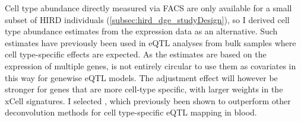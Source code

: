 Cell type abundance directly measured via \gls{FACS} are only available for a small subset of \gls{HIRD} individuals (\cref{subsec:hird_dge_studyDesign}), so I derived cell type abundance estimates from the expression data as an alternative.
Such estimates have previously been used in \gls{eQTL} analyses from bulk samples where cell type-specific effects are expected\autocite{westra2015CellSpecificEQTL,zhernakova2017IdentificationContextdependentExpression,davenport2018DiscoveringVivoCytokineeQTL,kim-hellmuth2020CellTypeSpecific}.
As the estimates are based on the expression of multiple genes, is not entirely circular to use them as covariates in this way for genewise \gls{eQTL} models.
The adjustment effect will however be stronger for genes that are more cell-type specific, with larger weights in the xCell signatures.
%
%
%
I selected \autocite{aran2017XCellDigitallyPortraying}, which previously been shown to outperform other deconvolution methods for cell type-specific \gls{eQTL} mapping in blood\autocite{kim-hellmuth2020CellTypeSpecific}.
